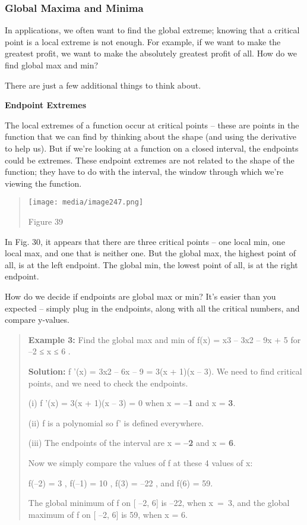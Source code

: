 \subsubsection{Global Maxima and Minima}\label{global-maxima-and-minima}

In applications, we often want to find the global extreme; knowing that
a critical point is a local extreme is not enough. For example, if we
want to make the greatest profit, we want to make the absolutely
greatest profit of all. How do we find global max and min?

There are just a few additional things to think about.

\textbf{Endpoint Extremes}

The local extremes of a function occur at critical points -- these are
points in the function that we can find by thinking about the shape (and
using the derivative to help us). But if we're looking at a function on
a closed interval, the endpoints could be extremes. These endpoint
extremes are not related to the shape of the function; they have to do
with the interval, the window through which we're viewing the function.

\begin{quote}
\texttt{[image: media/image247.png]}

Figure 39
\end{quote}

In Fig. 30, it appears that there are three critical points -- one local
min, one local max, and one that is neither one. But the global max, the
highest point of all, is at the left endpoint. The global min, the
lowest point of all, is at the right endpoint.

How do we decide if endpoints are global max or min? It's easier than
you expected -- simply plug in the endpoints, along with all the
critical numbers, and compare y-values.

\begin{quote}
\textbf{Example 3:} Find the global max and min of f(x) = x3 -- 3x2 --
9x + 5 for --2 ≤ x ≤ 6 .

\textbf{Solution:} f '(x) = 3x2 -- 6x -- 9 = 3(x + 1)(x -- 3). We need
to find critical points, and we need to check the endpoints.

(i) f '(x) = 3(x + 1)(x -- 3) = 0 when x = \textbf{--1} and x =
\textbf{3}.

(ii) f is a polynomial so f' is defined everywhere.

(iii) The endpoints of the interval are x = \textbf{--2} and x =
\textbf{6}.

Now we simply compare the values of f at these 4 values of x:

f(--2) = 3 , f(--1) = 10 , f(3) = --22 , and f(6) = 59.

The global minimum of f on {[} --2, 6{]} is --22, when x~=~3, and the
global maximum of f on {[} --2, 6{]} is 59, when x = 6.
\end{quote}

